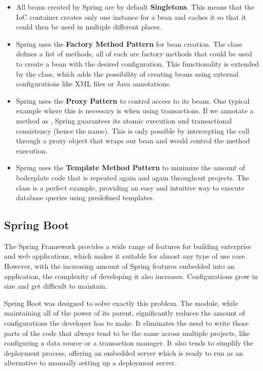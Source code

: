 \begin{itemize}
    \item All beans created by Spring are by default \textbf{Singletons}. This means that the IoC container creates only one instance for a bean and caches it so that it could then be used in multiple different places.
    \item Spring uses the \textbf{Factory Method Pattern} for bean creation. The  class defines a list of  methods, all of each are factory methods that could be used to create a bean with the desired configuration. This functionality is extended by the  class, which adds the possibility of creating beans using external configurations like XML files or Java annotations.
    \item Spring uses the \textbf{Proxy Pattern} to control access to its beans. One typical example where this is necessary is when using transactions. If we annotate a method as , Spring guarantees its atomic execution and transactional consistency (hence the name). This is only possible by intercepting the call through a proxy object that wraps our bean and would control the method execution.
    \item Spring uses the \textbf{Template Method Pattern} to minimize the amount of boilerplate code that is repeated again and again throughout projects. The  class is a perfect example, providing an easy and intuitive way to execute database queries using predefined templates.
\end{itemize}


\subsection{Spring Boot}
\label{subsection:springBoot}

The Spring Framework provides a wide range of features for building enterprise and web applications, which makes it suitable for almost any type of use case. However, with the increasing amount of Spring features embedded into an application, the complexity of developing it also increases. Configurations grow in size and get difficult to maintain.

Spring Boot was designed to solve exactly this problem. The module, while maintaining all of the power of its parent, significantly reduces the amount of configurations the developer has to make. It eliminates the need to write those parts of the code that always tend to be the same across multiple projects, like configuring a data source or a transaction manager. It also tends to simplify the deployment process, offering an embedded server which is ready to run as an alternative to manually setting up a deployment server.

